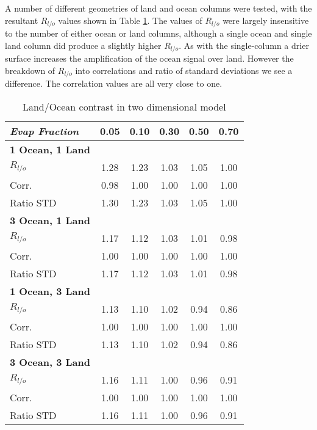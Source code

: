 A number of different geometries of land and ocean columns were tested, with the 
resultant $R_{l/o}$ values shown in Table \ref{tab:tdm_Rlo}. The values of 
$R_{l/o}$ were largely insensitive to the number of either ocean or land 
columns, although a single ocean and single land column did produce a slightly 
higher $R_{l/o}$. As with the single-column a drier surface increases the 
amplification of the ocean signal over land. However the breakdown of $R_{l/o}$ 
into correlations and ratio of standard deviations we see a difference. The 
correlation values are all very close to one.


\begin{center}
	\begin{table}[ht]
		\caption{Land/Ocean contrast in two dimensional model}
		\label{tab:tdm_Rlo}
		\scriptsize
	\begin{tabular}{ l  c  c  c  c  c }
		\hline
		\textit{Evap Fraction}	& 0.05  & 0.10 & 0.30  & 0.50  & 0.70 \\ \hline
		\textbf{1 Ocean, 1 Land}\\
		$R_{l/o}$ 					& 1.28  & 1.23 & 1.03  & 1.05 & 1.00\\ 
		Corr.					& 0.98  & 1.00 & 1.00  & 1.00 & 1.00\\ %
		Ratio STD          		& 1.30  & 1.23 & 1.03  & 1.05 & 1.00\\ \hline
		\textbf{3 Ocean, 1 Land}\\
		$R_{l/o}$ 					& 1.17  & 1.12 & 1.03  & 1.01 & 0.98\\ %
		Corr.					& 1.00  & 1.00 & 1.00  & 1.00 & 1.00\\ %
		Ratio STD          		& 1.17  & 1.12 & 1.03  & 1.01 & 0.98\\ \hline
		\textbf{1 Ocean, 3 Land}\\
		$R_{l/o}$ 					& 1.13  & 1.10 & 1.02  & 0.94 & 0.86\\ %
		Corr.					& 1.00  & 1.00 & 1.00  & 1.00 & 1.00\\ %
		Ratio STD          		& 1.13  & 1.10 & 1.02  & 0.94 & 0.86\\ \hline
		\textbf{3 Ocean, 3 Land}\\
		$R_{l/o}$ 					& 1.16  & 1.11 & 1.00  & 0.96 & 0.91\\ %
		Corr.					& 1.00  & 1.00 & 1.00  & 1.00 & 1.00\\ %
		Ratio STD          		& 1.16  & 1.11 & 1.00  & 0.96 & 0.91\\ \hline
	\end{tabular}
	\end{table}
\end{center}

